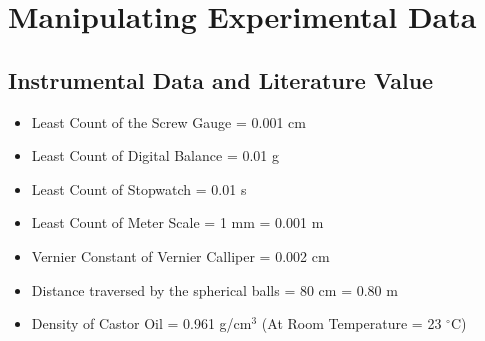 \documentclass[11pt, a4paper, abstract=true]{scrartcl}
\begin{document}
\begin{figure}[H]
\begin{minipage}{0.48\textwidth}
    \end{minipage}
\end{figure}

\section{Manipulating Experimental Data}
\subsection{Instrumental Data and Literature Value}
\begin{itemize}
    \item Least Count of the Screw Gauge = 0.001 cm
    \item Least Count of Digital Balance = 0.01 g
    \item Least Count of Stopwatch = 0.01 s
    \item Least Count of Meter Scale = 1 mm = 0.001 m
    \item Vernier Constant of Vernier Calliper = 0.002 cm
    \item Distance traversed by the spherical balls = 80 cm = 0.80 m
    \item Density of Castor Oil = 0.961 g/cm\(^3\) (At Room Temperature = 23 \(^{\circ}\)C)
\end{itemize}
\end{document}
